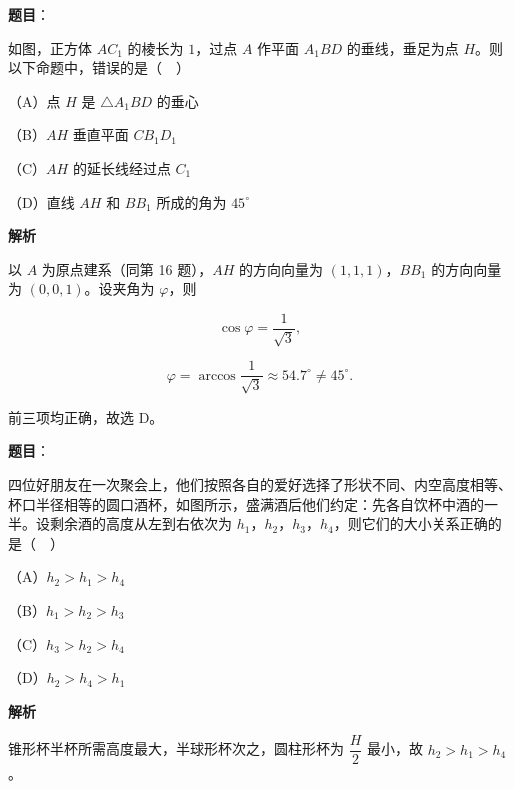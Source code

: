 \begin{answer}

\textbf{题目}：

如图，正方体 $AC_1$ 的棱长为 $1$，过点 $A$ 作平面 $A_1BD$ 的垂线，垂足为点 $H$。则以下命题中，错误的是（　）
\nopagebreak[4]
\begin{center}\end{center}
\nopagebreak[4]
（A）点 $H$ 是 $\triangle A_1BD$ 的垂心

（B）$AH$ 垂直平面 $CB_1D_1$

（C）$AH$ 的延长线经过点 $C_1$

（D）直线 $AH$ 和 $BB_1$ 所成的角为 $45^\circ$

\textbf{解析}

以 $A$ 为原点建系（同第 16 题），$AH$ 的方向向量为 $(1,1,1)$，$BB_1$ 的方向向量为 $(0,0,1)$。设夹角为 $\varphi$，则

\nopagebreak[4]
\[\cos\varphi=\frac1{\sqrt3},\]

\nopagebreak[4]
\[\varphi=\arccos\frac1{\sqrt3}\approx54.7^\circ\neq45^\circ.\]

前三项均正确，故选 D。


\end{answer}
\begin{answer}

\textbf{题目}：

四位好朋友在一次聚会上，他们按照各自的爱好选择了形状不同、内空高度相等、杯口半径相等的圆口酒杯，如图所示，盛满酒后他们约定：先各自饮杯中酒的一半。设剩余酒的高度从左到右依次为 $h_1$，$h_2$，$h_3$，$h_4$，则它们的大小关系正确的是（　）
\nopagebreak[4]
\begin{center}\end{center}
\nopagebreak[4]
（A）$h_2>h_1>h_4$

（B）$h_1>h_2>h_3$

（C）$h_3>h_2>h_4$

（D）$h_2>h_4>h_1$

\textbf{解析}

锥形杯半杯所需高度最大，半球形杯次之，圆柱形杯为 $\dfrac H2$ 最小，故 $h_2>h_1>h_4$。


\end{answer}
